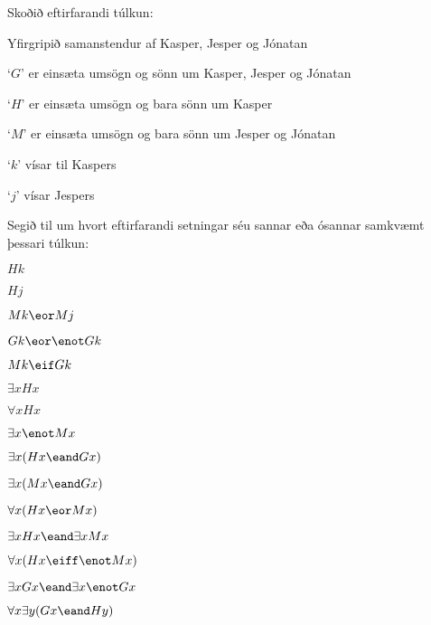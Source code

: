 \problempart
Skoðið eftirfarandi túlkun:	
	\begin{ebullet}
		\item Yfirgripið samanstendur af Kasper, Jesper og Jónatan
		\item `$G$' er einsæta umsögn og sönn um Kasper, Jesper og Jónatan
		\item `$H$' er einsæta umsögn og bara sönn um Kasper
		\item `$M$' er einsæta umsögn og bara sönn um Jesper og Jónatan
		\item `$k$' vísar til Kaspers
		\item `$j$' vísar Jespers
	\end{ebullet}
Segið til um hvort eftirfarandi setningar séu sannar eða ósannar samkvæmt þessari túlkun:
\begin{earg}
\item $Hk$
\item $Hj$
\item $Mk \eor Mj$
\item $Gk \eor \enot Gk$
\item $Mk \eif Gk$
\item $\exists x Hx$
\item $\forall x Hx$
\item $\exists x \enot Mx$
\item $\exists x(Hx \eand Gx)$
\item $\exists x(Mx \eand Gx)$
\item $\forall x(Hx \eor Mx)$
\item $\exists x Hx \eand \exists x Mx$
\item $\forall x(Hx \eiff \enot Mx)$
\item $\exists x Gx \eand \exists x \enot Gx$
\item $\forall x\exists y(Gx \eand Hy)$
\end{earg}

